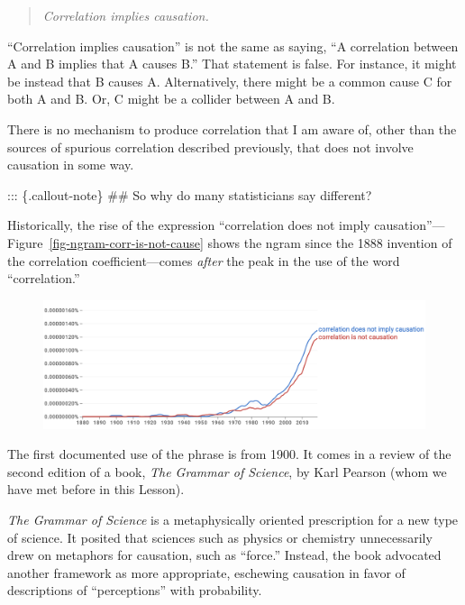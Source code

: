 \documentclass[
  letterpaper,
  DIV=11,
  numbers=noendperiod,
  oneside]{scrreprt}
\begin{document}
\begin{quote}
\emph{Correlation implies causation.}
\end{quote}

``Correlation implies causation'' is not the same as saying, ``A
correlation between A and B implies that A causes B.'' That statement is
false. For instance, it might be instead that B causes A. Alternatively,
there might be a common cause C for both A and B. Or, C might be a
collider between A and B.

There is no mechanism to produce correlation that I am aware of, other
than the sources of spurious correlation described previously, that does
not involve causation in some way.

::: \{.callout-note\} \#\# So why do many statisticians say different?

Historically, the rise of the expression ``correlation does not imply
causation''---Figure~\ref{fig-ngram-corr-is-not-cause} shows the ngram
since the 1888 invention of the correlation coefficient---comes
\emph{after} the peak in the use of the word ``correlation.''

\begin{figure}


{\centering \includegraphics[width=5.86in,height=\textheight]{./www/ngram-correlation-not-causation.png}

}

\end{figure}

The first documented use of the phrase is from 1900. It comes in a
review of the second edition of a book, \emph{The Grammar of Science},
by Karl Pearson (whom we have met before in this Lesson).

\emph{The Grammar of Science} is a metaphysically oriented prescription
for a new type of science. It posited that sciences such as physics or
chemistry unnecessarily drew on metaphors for causation, such as
``force.'' Instead, the book advocated another framework as more
appropriate, eschewing causation in favor of descriptions of
``perceptions'' with probability.
\end{document}
